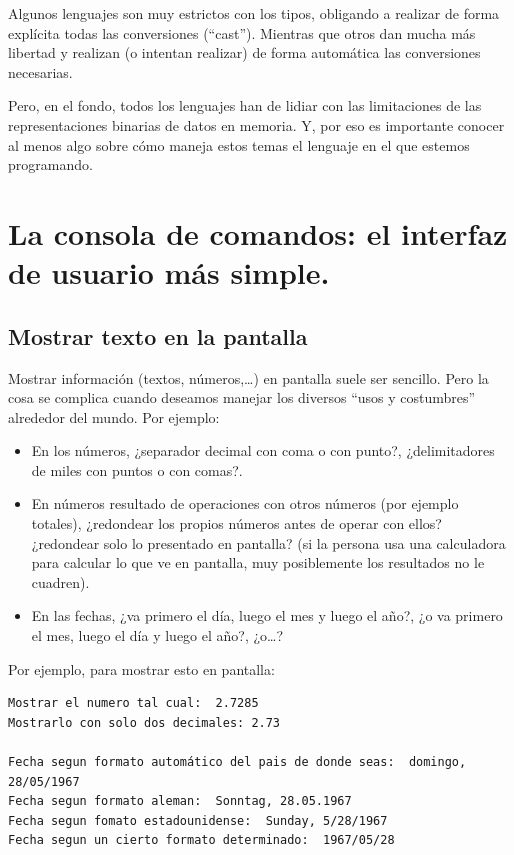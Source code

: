 \documentclass[spanish,12pt,a4paper,final,oneside]{book}
\begin{document}
Algunos lenguajes son muy estrictos con los tipos, obligando a realizar de forma explícita todas las conversiones (``cast''). Mientras que otros dan mucha más libertad y realizan (o intentan realizar) de forma automática las conversiones necesarias.

Pero, en el fondo, todos los lenguajes han de lidiar con las limitaciones de las representaciones binarias de datos en memoria. Y, por eso es importante conocer al menos algo sobre cómo maneja estos temas el lenguaje en el que estemos programando.





\chapter{La consola de comandos: el interfaz de usuario más simple.}


\section{Mostrar texto en la pantalla}
Mostrar información (textos, números,\ldots) en pantalla suele ser sencillo. Pero  la cosa se complica cuando deseamos manejar los diversos ``usos y costumbres'' alrededor del mundo. Por ejemplo:
\begin{itemize}
\item En los números, ¿separador decimal con coma o con punto?, ¿delimitadores de miles con puntos o con comas?.
\item En números resultado de operaciones con otros números (por ejemplo totales), ¿redondear los propios números antes de operar con ellos? ¿redondear solo lo presentado en pantalla? (si la persona usa una calculadora para calcular lo que ve en pantalla, muy posiblemente los resultados no le cuadren).
\item En las fechas, ¿va primero el día, luego el mes y luego el año?, ¿o va primero el mes, luego el día y luego el año?, ¿o\ldots?
\end{itemize}

Por ejemplo, para mostrar esto en pantalla:
\begin{lstlisting}
Mostrar el numero tal cual:  2.7285
Mostrarlo con solo dos decimales: 2.73

Fecha segun formato automático del pais de donde seas:  domingo, 28/05/1967
Fecha segun formato aleman:  Sonntag, 28.05.1967
Fecha segun fomato estadounidense:  Sunday, 5/28/1967
Fecha segun un cierto formato determinado:  1967/05/28
\end{lstlisting}
\end{document}
